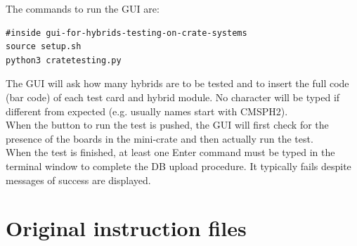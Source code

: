 \documentclass[10pt,a4paper]{article}
\begin{document}
The commands to run the GUI are:

\begin{framed}
\begin{verbatim}
#inside gui-for-hybrids-testing-on-crate-systems
source setup.sh
python3 cratetesting.py
\end{verbatim}
\end{framed}

The GUI will ask how many hybrids are to be tested and to insert the full code (bar code) of each test card and hybrid module.
No character will be typed if different from expected (e.g. usually names start with CMSPH2). \\
When the button to run the test is pushed, the GUI will first check for the presence of the boards in the mini-crate and then actually run the test. \\

When the test is finished, at least one Enter command must be typed in the terminal window to complete the DB upload procedure. It typically fails despite messages of success are displayed. 

\newpage

\appendix

\appendixpage
\section{Original instruction files}


\end{document}
